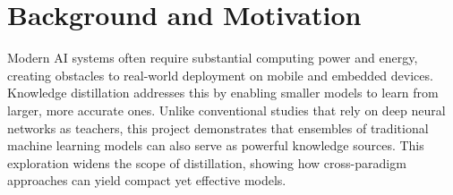 \documentclass{article}
\begin{document}

\printAffiliationsAndNotice{}

\begin{abstract}
%
This project investigates the transfer of information from an ensemble of machine learning teachers (Random Forest, SVM, KNN) to a compact MLP student. The goal is to maintain accuracy on MNIST while reducing computational demands, offering a pathway for efficient deployment of neural networks on
constrained hardware. 
\cite{hinton2015distilling}
\paragraph*{Code.} 
You can find the project as a notebook in Google Colab in this Github repository: \url{https://github.com/Spiky03/ML-project-2025}.
%
\end{abstract}

\section{Background and Motivation}

Modern AI systems often require substantial computing power and energy, creating obstacles to real-world deployment on mobile and embedded devices. Knowledge distillation addresses this by enabling smaller models to learn from larger, more accurate ones. Unlike conventional studies that rely on deep neural networks as teachers, this project demonstrates that ensembles of traditional machine learning models can also serve as powerful knowledge sources. This exploration widens the scope of distillation, showing how cross-paradigm approaches can yield compact yet effective models.
\end{document}
